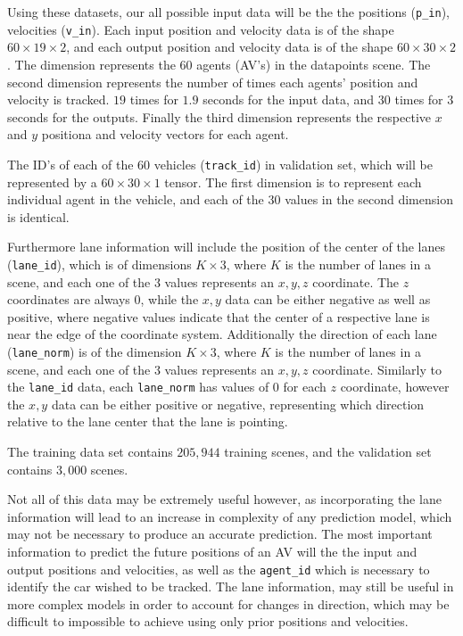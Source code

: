 \documentclass{article}
\begin{document}
      Using these datasets, our all possible input data will be the the positions (\texttt{p\_in}), velocities 
      (\texttt{v\_in}). Each input position and velocity data is of the shape $60 \times 19 \times 2$, and each output
      position and velocity data is of the shape $60 \times 30 \times 2$. The dimension represents the $60$ agents (AV's)
      in the datapoints scene. The second dimension represents the number of times each agents' position and velocity is tracked.
      $19$ times for $1.9$ seconds for the input data, and $30$ times for $3$ seconds for the outputs. Finally the third dimension
      represents the respective $x$ and $y$ positiona and velocity vectors for each agent.
      
      The ID's of each of the $60$ vehicles (\texttt{track\_id}) in validation set, which will be represented by a $60 \times 30 \times 1$ tensor.
      The first dimension is to represent each individual agent in the vehicle, and each of the $30$ values in the second dimension
      is identical. 
      
      Furthermore lane information will include the position of the center of the lanes (\texttt{lane\_id}), 
      which is of dimensions $K \times 3$, where $K$ is the number of lanes in
      a scene, and each one of the $3$ values represents an $x,y,z$ coordinate. The $z$ coordinates are always $0$, while the $x,y$
      data can be either negative as well as positive, where negative values indicate that the center of a respective lane
      is near the edge of the coordinate system. Additionally the direction of each lane 
      (\texttt{lane\_norm}) is of the dimension $K \times 3$, where $K$ is the number of lanes in
      a scene, and each one of the $3$ values represents an $x,y,z$ coordinate. Similarly to the \texttt{lane\_id} data, each 
      \texttt{lane\_norm} has values of $0$ for each $z$ coordinate, however the $x,y$ data can be either positive or negative, 
      representing which direction relative to the lane center that the lane is pointing.

      The training data set contains $205,944$ training scenes, and the validation set contains $3,000$ scenes. 

      Not all of this data may be extremely useful however, as incorporating the lane information will lead to an increase in complexity
      of any prediction model, which may not be necessary to produce an accurate prediction. The most important information to predict
      the future positions of an AV will the the input and output positions and velocities, as well as the \texttt{agent\_id} which is 
      necessary to identify the car wished to be tracked. The lane information, may still be useful in more complex models in order to 
      account for changes in direction, which may be difficult to impossible to achieve using only prior positions and velocities.
\end{document}
